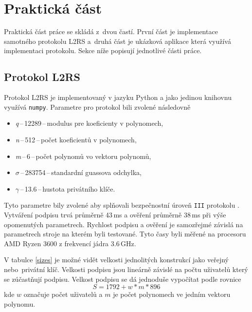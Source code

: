 
\newcommand{\param}[2]{\textit{#1}\,--\,#2\,--\,}
\newcommand{\paramnott}[2]{#1\,--\,#2\,--\,}

\chapter{Praktická část}
Praktická část práce se skládá z~dvou častí. První část je implementace samotného protokolu L2RS a~druhá část je ukázková aplikace která využívá implementaci protokolu. Sekce níže popisují jednotlivé části práce.

\section{Protokol L2RS}
Protokol L2RS je implementovaný v jazyku Python a jako jedinou knihovnu využívá \texttt{numpy}. Parametre pro protokol bili zvolené následovně
\begin{itemize}
  \item \param{q}{12289}modulus pre koeficienty v polynomech,
  \item \param{n}{512}počet koeficientů v polynomech,
  \item \param{m}{6}počet polynomů vo vektoru polynomů,
  \item \paramnott{$\sigma$}{283754}standardní guassova odchylka,
  \item \paramnott{$\gamma$}{13.6}hustota privátního klíče.
\end{itemize}
Tyto parametre bily zvolené aby splňovali bezpečnostní úroveň \texttt{III} protokolu \cite{Torres2018}. Vytváření podpisu trvá průměrně 43\,ms a ověření průměrně 38\,ms při výše opomenutých parametrech. Rychlost podpisu a ověření je samozřejmé závislá na parametrech stroje na kterém byli testované. Tyto časy byli měřené na procesoru AMD Ryzen 3600 z frekvencí jádra 3.6\,GHz.

V tabulce \ref{sizes} je možné vidět velkosti jednolitých konstrukcí jako veřejný nebo~privátní klíč. Velkosti podpisu jsou lineárně závislé na počtu uživatelů který se zúčastňují podpisu. Velkost podpisu se dá jednoduše vypočítat podle rovnice
\begin{equation}
  S=1792+w*m*896
\end{equation}
kde $w$ označuje počet uživatelů a $m$ je počet polynomech ve jedním vektoru polynomu.

